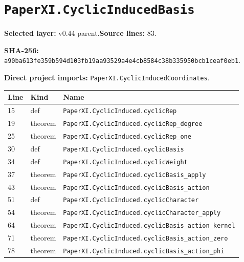 \documentclass[10pt,oneside]{book}
\begin{document}
\section{\texorpdfstring{\nolinkurl{PaperXI.CyclicInducedBasis}}{PaperXI.CyclicInducedBasis}}\label{module:PaperXI.CyclicInducedBasis}

\textbf{Selected layer:} v0.44 parent.\quad\textbf{Source lines:} 83.\par\textbf{SHA-256:} {\scriptsize\nolinkurl{a90ba613fe359b594d103fb19aa93529a4e4cb8584c38b335950bcb1ceaf0eb1}}.


\textbf{Direct project imports:} \nolinkurl{PaperXI.CyclicInducedCoordinates}.

\begin{longtable}{@{}p{}p{}p{}@{}}\toprule Line&Kind&Name\\\midrule\endhead

15&def&\nolinkurl{PaperXI.CyclicInduced.cyclicRep}\\

19&theorem&\nolinkurl{PaperXI.CyclicInduced.cyclicRep_degree}\\

25&theorem&\nolinkurl{PaperXI.CyclicInduced.cyclicRep_one}\\

30&def&\nolinkurl{PaperXI.CyclicInduced.cyclicBasis}\\

34&def&\nolinkurl{PaperXI.CyclicInduced.cyclicWeight}\\

37&theorem&\nolinkurl{PaperXI.CyclicInduced.cyclicBasis_apply}\\

43&theorem&\nolinkurl{PaperXI.CyclicInduced.cyclicBasis_action}\\

51&def&\nolinkurl{PaperXI.CyclicInduced.cyclicCharacter}\\

54&theorem&\nolinkurl{PaperXI.CyclicInduced.cyclicCharacter_apply}\\

64&theorem&\nolinkurl{PaperXI.CyclicInduced.cyclicBasis_action_kernel}\\

71&theorem&\nolinkurl{PaperXI.CyclicInduced.cyclicBasis_action_zero}\\

78&theorem&\nolinkurl{PaperXI.CyclicInduced.cyclicBasis_action_phi}\\

\bottomrule\end{longtable}
\end{document}
